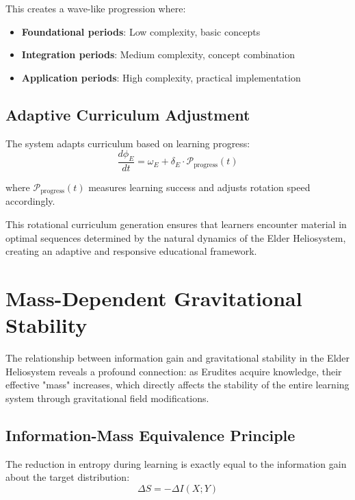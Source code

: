 This creates a wave-like progression where:
\begin{itemize}
    \item \textbf{Foundational periods}: Low complexity, basic concepts
    \item \textbf{Integration periods}: Medium complexity, concept combination
    \item \textbf{Application periods}: High complexity, practical implementation
\end{itemize}

\subsection{Adaptive Curriculum Adjustment}

The system adapts curriculum based on learning progress:
\begin{equation}
\frac{d\phi_E}{dt} = \omega_E + \delta_E \cdot \mathcal{P}_{\text{progress}}(t)
\end{equation}

where $\mathcal{P}_{\text{progress}}(t)$ measures learning success and adjusts rotation speed accordingly.

This rotational curriculum generation ensures that learners encounter material in optimal sequences determined by the natural dynamics of the Elder Heliosystem, creating an adaptive and responsive educational framework.

\section{Mass-Dependent Gravitational Stability}

The relationship between information gain and gravitational stability in the Elder Heliosystem reveals a profound connection: as Erudites acquire knowledge, their effective "mass" increases, which directly affects the stability of the entire learning system through gravitational field modifications.

\subsection{Information-Mass Equivalence Principle}

The reduction in entropy during learning is exactly equal to the information gain about the target distribution:
\begin{equation}
\Delta S = -\Delta I(X; Y)
\end{equation}

